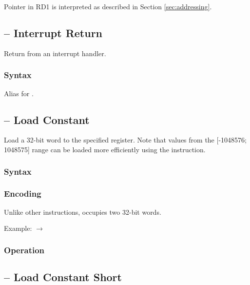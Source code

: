 \documentclass[a4paper,12pt,twoside,extrafontsizes]{memoir}
\begin{document}
{Pointer in RD1 is interpreted as described in Section \ref{sec:addressing}.

\subsection{ -- Interrupt Return}
\label{subsec:instr:iret}

Return from an interrupt handler.

\subsubsection{Syntax}


Alias for .

\subsection{ -- Load Constant}
\label{subsec:instr:lc}

Load a 32-bit word to the specified register. Note that values from the [-1048576; 1048575] range can be loaded more efficiently using the  instruction.

\subsubsection{Syntax}


\subsubsection{Encoding}


Unlike other instructions,  occupies two 32-bit words.

Example:  $\rightarrow$ 

\subsubsection{Operation}


\subsection{ -- Load Constant Short}
\label{subsec:instr:lcs}

}
\end{document}
